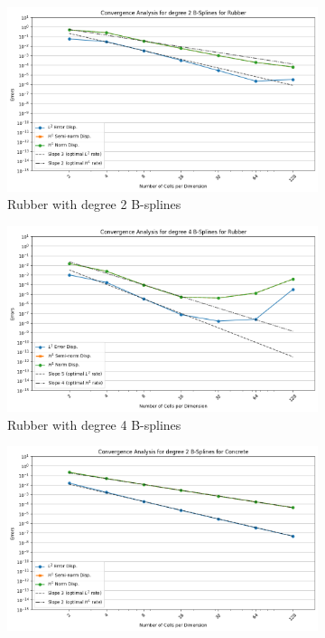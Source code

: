 \documentclass[a4paper,12pt,twoside]{report}
\begin{document}
\begin{figure}[!h]
	\centering
	\begin{subfigure}[b]{0.49\textwidth}
		\centering
		\includegraphics[width=\textwidth]{figures/figures_non_mixed_realistic/convergence_plot_degree_2_lambda=160000000.0.png}
		\caption{Rubber with degree 2 B-splines}
		\label{fig:rubber_degree_2}
	\end{subfigure}
	\begin{subfigure}[b]{0.49\textwidth}
		\centering
		\includegraphics[width=\textwidth]{figures/figures_non_mixed_realistic/convergence_plot_degree_4_lambda=160000000.0.png}
		\caption{Rubber with degree 4 B-splines}
		\label{fig:rubber_degree_4}
	\end{subfigure}
	\centering
	\begin{subfigure}[b]{0.49\textwidth}
		\centering
		\includegraphics[width=\textwidth]{figures/figures_non_mixed_realistic/convergence_plot_degree_2_lambda=17000000000.0.png}

\end{subfigure}
\end{figure}
\end{document}
